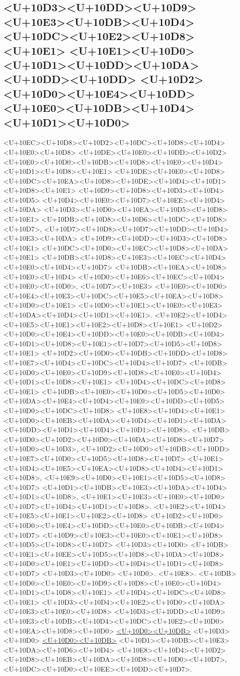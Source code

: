 \documentclass{article}
\begin{document}
\subsection*{<U+10D3><U+10DD><U+10D9><U+10E3><U+10DB><U+10D4><U+10DC><U+10E2><U+10D8><U+10E1> <U+10E1><U+10D0><U+10D1><U+10DD><U+10DA><U+10DD><U+10DD> <U+10D2><U+10D0><U+10E4><U+10DD><U+10E0><U+10DB><U+10D4><U+10D1><U+10D0>}

<U+10EC><U+10D8><U+10D2><U+10DC><U+10D8><U+10D4><U+10E0><U+10D8> <U+10DE><U+10E0><U+10DD><U+10D2><U+10E0><U+10D0><U+10DB><U+10D8><U+10E0><U+10D4><U+10D1><U+10D8><U+10E1> <U+10DE><U+10E0><U+10D8><U+10DC><U+10EA><U+10D8><U+10DE><U+10D4><U+10D1><U+10D8><U+10E1> <U+10D9><U+10D8><U+10D3><U+10D4><U+10D5> <U+10D4><U+10E0><U+10D7><U+10EE><U+10D4><U+10DA> <U+10D3><U+10D0><U+10EA><U+10D5><U+10D8><U+10E1> <U+10DB><U+10D8><U+10D6><U+10DC><U+10D8><U+10D7>, <U+10D7><U+10D8><U+10D7><U+10DD><U+10D4><U+10E3><U+10DA> <U+10D9><U+10DD><U+10D3><U+10D8><U+10E1> <U+10DC><U+10D0><U+10EC><U+10D8><U+10DA><U+10E1> <U+10DB><U+10D8><U+10E3><U+10EC><U+10D4><U+10E0><U+10D4><U+10D7> <U+10DB><U+10EA><U+10D8><U+10E0><U+10D4> <U+10D0><U+10E6><U+10EC><U+10D4><U+10E0><U+10D0>, <U+10D7><U+10E3> <U+10E0><U+10D0> <U+10E4><U+10E3><U+10DC><U+10E5><U+10EA><U+10D8><U+10D0><U+10E1> <U+10D0><U+10E1><U+10E0><U+10E3><U+10DA><U+10D4><U+10D1><U+10E1>. <U+10E2><U+10D4><U+10E5><U+10E1><U+10E2><U+10D8><U+10E1> <U+10D2><U+10D0><U+10E4><U+10DD><U+10E0><U+10DB><U+10D4><U+10D1><U+10D8><U+10E1><U+10D7><U+10D5><U+10D8><U+10E1> <U+10D2><U+10D0><U+10DB><U+10DD><U+10D8><U+10E7><U+10D4><U+10DC><U+10D4><U+10D7> <U+10DB><U+10D0><U+10E0><U+10D9><U+10D8><U+10E0><U+10D4><U+10D1><U+10D8><U+10E1> <U+10D4><U+10DC><U+10D8><U+10E1> <U+10DB><U+10E0><U+10D0><U+10D5><U+10D0><U+10DA><U+10E4><U+10D4><U+10E0><U+10DD><U+10D5><U+10D0><U+10DC><U+10D8> <U+10E8><U+10D4><U+10E1><U+10D0><U+10EB><U+10DA><U+10D4><U+10D1><U+10DA><U+10DD><U+10D1><U+10D4><U+10D1><U+10D8>. <U+10DB><U+10D0><U+10D2><U+10D0><U+10DA><U+10D8><U+10D7><U+10D0><U+10D3>, <U+10D2><U+10D0><U+10DB><U+10DD><U+10E7><U+10D0><U+10D5><U+10D8><U+10D7> <U+10E1><U+10D4><U+10E5><U+10EA><U+10D8><U+10D4><U+10D1><U+10D8>, <U+10E9><U+10D0><U+10E1><U+10D5><U+10D8><U+10D7> <U+10D1><U+10DB><U+10E3><U+10DA><U+10D4><U+10D1><U+10D8>, <U+10E1><U+10E3><U+10E0><U+10D0><U+10D7><U+10D4><U+10D1><U+10D8>. <U+10E2><U+10D4><U+10E5><U+10E1><U+10E2><U+10D8> <U+10D2><U+10D0><U+10D0><U+10E4><U+10DD><U+10E0><U+10DB><U+10D4><U+10D7> <U+10D9><U+10E3><U+10E0><U+10E1><U+10D8><U+10D5><U+10D8><U+10D7> <U+10D3><U+10D0> <U+10DB><U+10E1><U+10EE><U+10D5><U+10D8><U+10DA><U+10D8> <U+10D0><U+10E1><U+10DD><U+10D4><U+10D1><U+10D8><U+10D7> <U+10D3><U+10D0> <U+10D0>. <U+10E8>. <U+10DB><U+10D0><U+10E0><U+10D9><U+10D8><U+10E0><U+10D4><U+10D1><U+10D8><U+10E1> <U+10D4><U+10DC><U+10D8><U+10E1> <U+10D3><U+10D4><U+10E2><U+10D0><U+10DA><U+10E3><U+10E0><U+10D8> <U+10D3><U+10DD><U+10D9><U+10E3><U+10DB><U+10D4><U+10DC><U+10E2><U+10D0><U+10EA><U+10D8><U+10D0> \href{https://www.rstudio.com/wp-content/uploads/2016/03/rmarkdown-cheatsheet-2.0.pdf}{<U+10D0><U+10DB>} <U+10D3><U+10D0>  \href{https://github.com/adam-p/markdown-here/wiki/Markdown-Cheatsheet}{<U+10D0><U+10DB>} <U+10D1><U+10DB><U+10E3><U+10DA><U+10D6><U+10D4> <U+10E8><U+10D4><U+10D2><U+10D8><U+10EB><U+10DA><U+10D8><U+10D0><U+10D7>, <U+10DC><U+10D0><U+10EE><U+10DD><U+10D7>.
\end{document}
